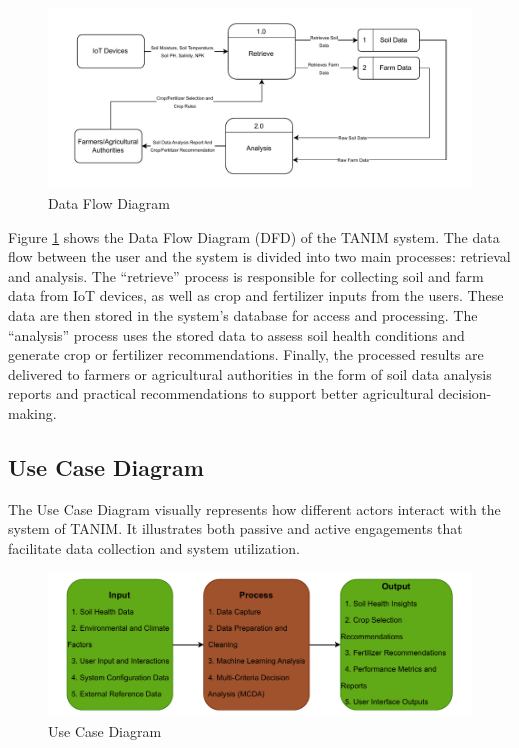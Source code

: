 {	\begin{figure}[H]
		\centering
		\caption{Data Flow Diagram}
		\label{fig:DFD}
		\includegraphics[width=1\textwidth]{figures/DFD.pdf}
	\end{figure}
	
	Figure \ref{fig:DFD} shows the Data Flow Diagram (DFD) of the TANIM system. The data flow between the user and the system is divided into two main processes: retrieval and analysis. The “retrieve” process is responsible for collecting soil and farm data from IoT devices, as well as crop and fertilizer inputs from the users. These data are then stored in the system’s database for access and processing. The “analysis” process uses the stored data to assess soil health conditions and generate crop or fertilizer recommendations. Finally, the processed results are delivered to farmers or agricultural authorities in the form of soil data analysis reports and practical recommendations to support better agricultural decision-making.
	
	\subsection{Use Case Diagram}
	The Use Case Diagram visually represents how different actors interact with the system of TANIM. It illustrates both passive and active engagements that facilitate data collection and system utilization.
	
	\begin{figure}[H]
		\centering
		\caption{Use Case Diagram}
		\label{fig:FarmerUseCase}
		\includegraphics[width=1\textwidth]{figures/IPO.pdf}
	\end{figure}
	
}
